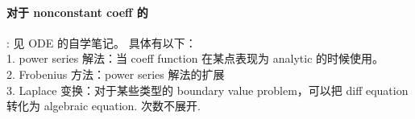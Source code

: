\paragraph{对于 nonconstant coeff 的}: 
见 ODE 的自学笔记。
具体有以下：\\
1. power series 解法：当 coeff function 在某点表现为 analytic 的时候使用。
\\2. Frobenius 方法：power series 解法的扩展
\\3. Laplace 变换：对于某些类型的 boundary value problem，可以把 diff equation 转化为 algebraic equation.
次数不展开.
